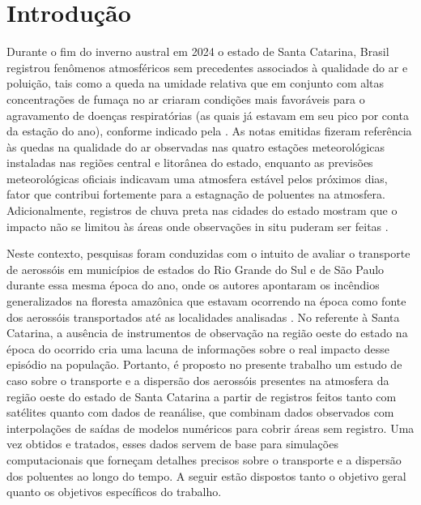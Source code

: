 \chapter{Introdução}

	Durante o fim do inverno austral em 2024 o estado de Santa Catarina, Brasil registrou fenômenos atmosféricos sem precedentes associados à qualidade do ar e poluição, tais como a queda na umidade relativa que em conjunto com altas concentrações de fumaça no ar criaram condições mais favoráveis para o agravamento de doenças respiratórias (as quais já estavam em seu pico por conta da estação do ano), conforme indicado pela \autocite{santacatarina_ima2026}.  As notas emitidas fizeram referência às quedas na qualidade do ar observadas nas quatro estações meteorológicas instaladas nas regiões central e litorânea do estado, enquanto as previsões meteorológicas oficiais indicavam uma atmosfera estável pelos próximos dias, fator que contribui fortemente para a estagnação de poluentes na atmosfera. Adicionalmente, registros de chuva preta nas cidades do estado mostram que o impacto não se limitou às áreas onde observações in situ puderam ser feitas  \autocite{epagri2024chuvapreta}.
	
	Neste contexto, pesquisas foram conduzidas com o intuito de avaliar o transporte de aerossóis em municípios de estados do Rio Grande do Sul e de São Paulo durante essa mesma época do ano, onde os autores apontaram os incêndios generalizados na floresta amazônica que estavam ocorrendo na época como fonte dos aerossóis transportados até as  localidades analisadas \autocite{forgioni2025}. No referente à Santa Catarina, a ausência de instrumentos de observação na região oeste do estado na época do ocorrido cria uma lacuna de informações sobre o real impacto desse episódio na população. Portanto, é proposto no presente trabalho um estudo de caso sobre o transporte e a dispersão dos aerossóis presentes na atmosfera da região oeste do estado de Santa Catarina a partir de registros feitos tanto com satélites quanto com dados de reanálise, que combinam dados observados com interpolações de saídas de modelos numéricos para cobrir áreas sem registro. Uma vez obtidos e tratados, esses dados servem de base para simulações computacionais que forneçam detalhes precisos sobre o transporte e a dispersão dos poluentes ao longo do tempo. A seguir estão dispostos tanto o objetivo geral quanto os objetivos específicos do trabalho. 



